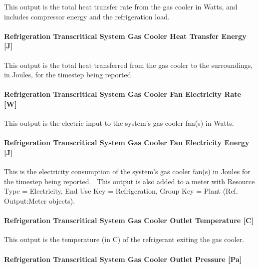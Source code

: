 This output is the total heat transfer rate from the gas cooler in Watts, and includes compressor energy and the refrigeration load.

\paragraph{Refrigeration Transcritical System Gas Cooler Heat Transfer Energy {[}J{]}}\label{refrigeration-transcritical-system-gas-cooler-heat-transfer-energy-j}

This output is the total heat transferred from the gas cooler to the surroundings, in Joules, for the timestep being reported.

\paragraph{Refrigeration Transcritical System Gas Cooler Fan Electricity Rate {[}W{]}}\label{refrigeration-transcritical-system-gas-cooler-fan-electric-power-w}

This output is the electric input to the system's gas cooler fan(s) in Watts.

\paragraph{Refrigeration Transcritical System Gas Cooler Fan Electricity Energy {[}J{]}}\label{refrigeration-transcritical-system-gas-cooler-fan-electric-energy-j}

This is the electricity consumption of the system's gas cooler fan(s) in Joules for the timestep being reported.~ This output is also added to a meter with Resource Type = Electricity, End Use Key = Refrigeration, Group Key = Plant (Ref. Output:Meter objects).

\paragraph{Refrigeration Transcritical System Gas Cooler Outlet Temperature {[}C{]}}\label{refrigeration-transcritical-system-gas-cooler-outlet-temperature-c}

This output is the temperature (in C) of the refrigerant exiting the gas cooler.

\paragraph{Refrigeration Transcritical System Gas Cooler Outlet Pressure {[}Pa{]}}\label{refrigeration-transcritical-system-gas-cooler-outlet-pressure-pa}

